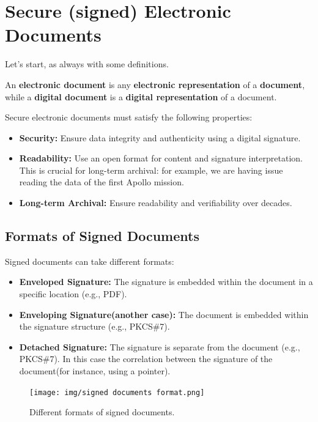 \chapter{Secure (signed) Electronic Documents}

Let's start, as always with some definitions.
\begin{boxH}
  An \textbf{electronic document} is any \textbf{electronic
  representation} of a \textbf{document}, while a \textbf{digital
  document} is a \textbf{digital representation} of a document.
\end{boxH}

Secure electronic documents must satisfy the following properties:
\begin{itemize}
    \item \textbf{Security:} Ensure data integrity and authenticity
      using a digital signature.
    \item \textbf{Readability:} Use an open format for content and
      signature interpretation. This is crucial for long-term 
      archival: for example, we are having issue reading the data of
      the first Apollo mission.
    \item \textbf{Long-term Archival:} Ensure readability and
      verifiability over decades.
\end{itemize}

\section{Formats of Signed Documents}
\label{sec:formats of signed documents}
Signed documents can take different formats:
\begin{itemize}
    \item \textbf{Enveloped Signature:} The signature is embedded
      within the document in a specific location (e.g., PDF).
    \item \textbf{Enveloping Signature(another case):} The document is
      embedded within the signature structure (e.g., PKCS\#7).
    \item \textbf{Detached Signature:} The signature is separate from
      the document (e.g., PKCS\#7). In this case the correlation
      between the signature of the document(for instance, using a
      pointer).
\end{itemize}

\begin{figure}[H]
  \centering
  \texttt{[image: img/signed documents
  format.png]}
  \caption{Different formats of signed documents.}
\end{figure}

